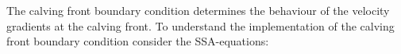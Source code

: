 \documentclass[a4paper,10pt]{article}
\begin{document}

\noindent The calving front boundary condition determines the behaviour of the velocity gradients at the calving front. To understand the implementation of the calving front boundary condition consider the SSA-equations:
\end{document}
